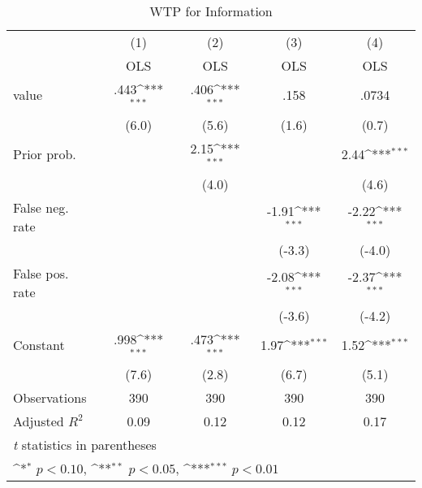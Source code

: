 \begin{table}[htbp]\centering
\def\sym#1{\ifmmode^{#1}\else\(^{#1}\)\fi}
\caption{WTP for Information}
\begin{tabular}{l*{4}{c}}
\hline\hline
                &\multicolumn{1}{c}{(1)}&\multicolumn{1}{c}{(2)}&\multicolumn{1}{c}{(3)}&\multicolumn{1}{c}{(4)}\\
                &\multicolumn{1}{c}{OLS}&\multicolumn{1}{c}{OLS}&\multicolumn{1}{c}{OLS}&\multicolumn{1}{c}{OLS}\\
\hline
value           &     .443\sym{***}&     .406\sym{***}&     .158         &    .0734         \\
                &    (6.0)         &    (5.6)         &    (1.6)         &    (0.7)         \\
Prior prob.     &                  &     2.15\sym{***}&                  &     2.44\sym{***}\\
                &                  &    (4.0)         &                  &    (4.6)         \\
False neg. rate &                  &                  &    -1.91\sym{***}&    -2.22\sym{***}\\
                &                  &                  &   (-3.3)         &   (-4.0)         \\
False pos. rate &                  &                  &    -2.08\sym{***}&    -2.37\sym{***}\\
                &                  &                  &   (-3.6)         &   (-4.2)         \\
Constant        &     .998\sym{***}&     .473\sym{***}&     1.97\sym{***}&     1.52\sym{***}\\
                &    (7.6)         &    (2.8)         &    (6.7)         &    (5.1)         \\
\hline
Observations    &      390         &      390         &      390         &      390         \\
Adjusted \(R^{2}\)&     0.09         &     0.12         &     0.12         &     0.17         \\
\hline\hline
\multicolumn{5}{l}{\footnotesize \textit{t} statistics in parentheses}\\
\multicolumn{5}{l}{\footnotesize \sym{*} \(p<0.10\), \sym{**} \(p<0.05\), \sym{***} \(p<0.01\)}\\
\end{tabular}
\end{table}

